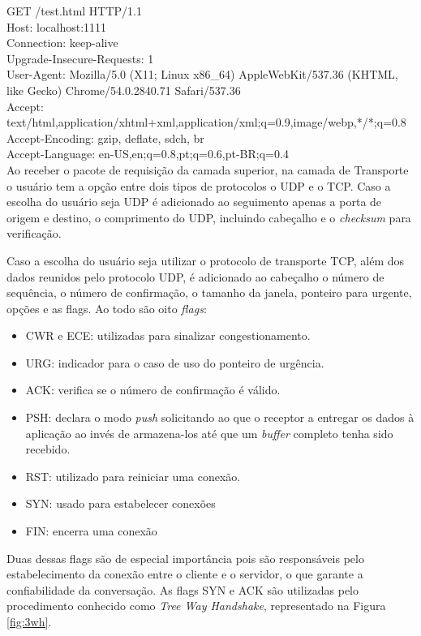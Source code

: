 \noindent
GET /test.html HTTP/1.1\\
Host: localhost:1111\\
Connection: keep-alive\\
Upgrade-Insecure-Requests: 1\\
User-Agent: Mozilla/5.0 (X11; Linux x86\_64) AppleWebKit/537.36 (KHTML, like Gecko)
Chrome/54.0.2840.71 Safari/537.36\\
Accept: text/html,application/xhtml+xml,application/xml;q=0.9,image/webp,*/*;q=0.8\\
Accept-Encoding: gzip, deflate, sdch, br\\
Accept-Language: en-US,en;q=0.8,pt;q=0.6,pt-BR;q=0.4\\

Ao receber o pacote de requisição da camada superior, na camada de Transporte o usuário tem a opção entre dois tipos de protocolos o UDP e o TCP. Caso a escolha do usuário seja UDP \'e adicionado ao seguimento apenas a porta de origem e destino, o comprimento do UDP, incluindo cabeçalho e o \textit{checksum} para verificação.

Caso a escolha do usuário seja utilizar o protocolo de transporte TCP, além dos dados reunidos pelo protocolo UDP, é adicionado ao cabeçalho o número de sequência, o número de confirmação, o tamanho da janela, ponteiro para urgente, opções e as flags. Ao todo são oito \textit{flags}: 

\begin{itemize}
	\item CWR e ECE: utilizadas para sinalizar congestionamento.
	\item URG: indicador para o caso de uso do ponteiro de urgência.
	\item ACK: verifica se o número de confirmação é válido.
	\item PSH: declara o modo \textit{push} solicitando ao que o receptor a entregar os dados à aplicação ao invés de armazena-los até que um \textit{buffer} completo tenha sido recebido.
	\item RST: utilizado para reiniciar uma conexão.
	\item SYN: usado para estabelecer conex\~oes
	\item FIN: encerra uma conex\~ao
\end{itemize}

Duas dessas flags s\~ao de especial import\^ancia pois s\~ao respons\'aveis pelo estabelecimento da conex\~ao entre o cliente e o servidor, o que garante a confiabilidade da conversaç\~ao. As flags SYN e ACK s\~ao utilizadas pelo procedimento conhecido como \textit{Tree Way Handshake}, representado na Figura \ref{fig:3wh}.

